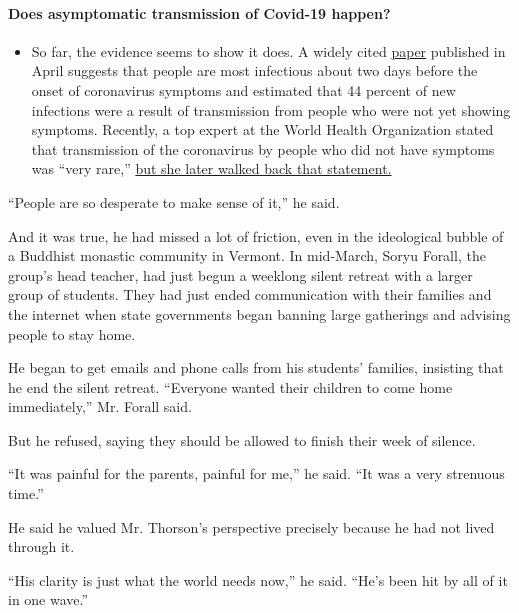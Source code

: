 \begin{itemize}
{  \paragraph{Does asymptomatic transmission of Covid-19
  happen?}\label{does-asymptomatic-transmission-of-covid-19-happen}}

  \begin{itemize}
  \tightlist
  \item
    So far, the evidence seems to show it does. A widely cited
    \href{https://www.nature.com/articles/s41591-020-0869-5}{paper}
    published in April suggests that people are most infectious about
    two days before the onset of coronavirus symptoms and estimated that
    44 percent of new infections were a result of transmission from
    people who were not yet showing symptoms. Recently, a top expert at
    the World Health Organization stated that transmission of the
    coronavirus by people who did not have symptoms was ``very rare,''
    \href{https://www.nytimes.com/2020/06/09/world/coronavirus-updates.html?action=click\&pgtype=Article\&state=default\&region=MAIN_CONTENT_3\&context=storylines_faq\#link-1f302e21}{but
    she later walked back that statement.}
  \end{itemize}
\end{itemize}

``People are so desperate to make sense of it,'' he said.

And it was true, he had missed a lot of friction, even in the
ideological bubble of a Buddhist monastic community in Vermont. In
mid-March, Soryu Forall, the group's head teacher, had just begun a
weeklong silent retreat with a larger group of students. They had just
ended communication with their families and the internet when state
governments began banning large gatherings and advising people to stay
home.

He began to get emails and phone calls from his students' families,
insisting that he end the silent retreat. ``Everyone wanted their
children to come home immediately,'' Mr. Forall said.

But he refused, saying they should be allowed to finish their week of
silence.

``It was painful for the parents, painful for me,'' he said. ``It was a
very strenuous time.''

He said he valued Mr. Thorson's perspective precisely because he had not
lived through it.

``His clarity is just what the world needs now,'' he said. ``He's been
hit by all of it in one wave.''

